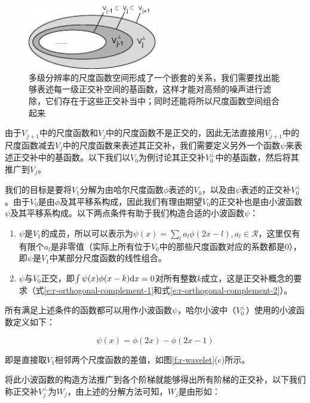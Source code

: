\begin{figure}
	\sidecaption
	\includegraphics[width=0.5\textwidth]{figures/r/v-j}
	\caption{多级分辨率的尺度函数空间形成了一个嵌套的关系，我们需要找出能够表述每一级正交补空间的基函数，这样才能对高频的噪声进行滤除，它们存在于这些正交补当中；同时还能将所以尺度函数空间组合起来}
	\label{f:r-v-j}
\end{figure}

由于$V_{j+1}$中的尺度函数和$V_j$中的尺度函数不是正交的，因此无法直接用$V_{j+1}$中的尺度函数减去$V_j$中的尺度函数来表述其正交补，我们需要定义另外一个函数$\psi$来表述正交补中的基函数。以下我们以$V_0$为例讨论其正交补$V^{\perp}_0$中的基函数，然后将其推广到$V_j$。

我们的目标是要将$V_1$分解为由哈尔尺度函数$\phi$表述的$V_0$，以及由$\psi$表述的正交补$V^{\perp}_0$。由于$V_0$是由$\phi$及其平移系构成，因此我们有理由期望$V_0$的正交补也是由小波函数$\psi$及其平移系构成。以下两点条件有助于我们构造合适的小波函数$\psi$：

\begin{enumerate}
	\item $\psi$是$V_1$的成员，所以可以表示为$\psi(x)=\sum_{l}a_l\phi(2x-l),a_l\in\mathcal{R}$，这里仅有有限个$a_l$是非零值（实际上所有位于$V_0$中的那些尺度函数对应的系数都是0），即$\psi$是$V_1$中某部分尺度函数的线性组合。
	\item $\psi$与$V_0$正交，即$\int\psi(x)\phi(x-k){\rm d}x=0$对所有整数$k$成立，这是正交补概念的要求（式\ref{e:r-orthogonal-complement-1}和式\ref{e:r-orthogonal-complement-2}）。
\end{enumerate}

所有满足上述条件的函数都可以用作小波函数$\psi$，哈尔小波中（$V^{\perp}_0$）使用的小波函数定义如下：

\begin{equation}
	\psi(x)=\phi(2x)-\phi(2x-1)
\end{equation}

\noindent 即是直接取$V_1$相邻两个尺度函数的差值，如图\ref{f:r-wavelet}(c)所示。

将此小波函数的构造方法推广到各个阶梯就能够得出所有阶梯的正交补，以下我们称正交补$V^{\perp}_j$为$W_j$，由上述的分解方法可知，$W_j$是由形如：

